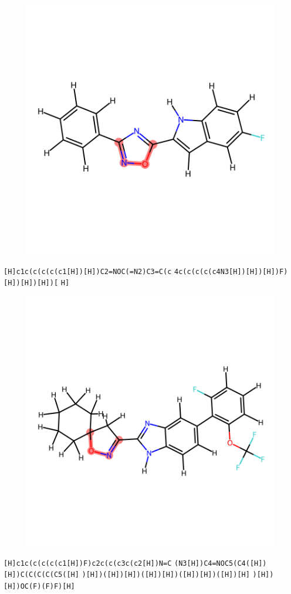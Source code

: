 \documentclass{article}
\begin{document}
\begin{figure}[ht]
\centering
    \includegraphics{mol122.png}
\end{figure}
\verb|[H]c1c(c(c(c(c1[H])[H])C2=NOC(=N2)C3=C(c| \verb|4c(c(c(c(c4N3[H])[H])[H])F)[H])[H])[H])[| \verb|H]|

\begin{figure}[ht]
\centering
    \includegraphics{mol123.png}
\end{figure}
\verb|[H]c1c(c(c(c(c1[H])F)c2c(c(c3c(c2[H])N=C| \verb|(N3[H])C4=NOC5(C4([H])[H])C(C(C(C(C5([H]| \verb|)[H])([H])[H])([H])[H])([H])[H])([H])[H]| \verb|)[H])[H])OC(F)(F)F)[H]|
\end{document}

